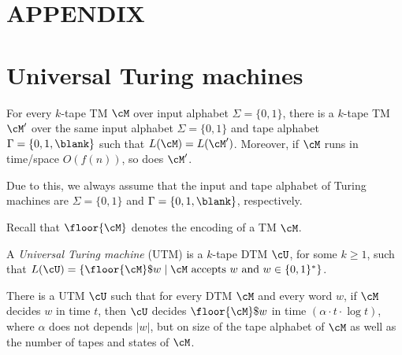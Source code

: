 \documentclass[11pt, a4paper]{article}
\begin{document}
\newpage
\appendix


\section*{APPENDIX}


\section{Universal Turing machines}


\begin{remark}
For every $k$-tape TM $\cM$ over input alphabet $\Sigma=\{0,1\}$,
there is a $k$-tape TM $\cM'$ over the same input alphabet $\Sigma =\{0,1\}$
and tape alphabet $\Gamma=\{0,1,\blank\}$ such that
$L(\cM)=L(\cM')$.
Moreover, if $\cM$ runs in time/space $O(f(n))$, so does $\cM'$.

Due to this, we always assume that the input and tape alphabet of Turing machines are 
$\Sigma=\{0,1\}$ and $\Gamma =\{0,1,\blank\}$, respectively. 
\end{remark}

Recall that $\floor {\cM}$ denotes the encoding of a TM $\cM$.

\begin{definition}
\label{def:utm}
A {\em Universal Turing machine} (UTM) is a $k$-tape DTM $\cU$, for some $k\geq 1$,
such that $L(\cU) = \{\floor{\cM}\$w \mid \cM \ \text{accepts}\ w \ \text{and}\ w \in \{0,1\}^*\}$.
\end{definition}

\begin{theorem}
\label{theo:utm}
There is a UTM $\cU$ such that for every DTM $\cM$ and every word $w$,
if $\cM$ decides $w$ in time $t$,
then $\cU$ decides $\floor{\cM}\$w$ in time $(\alpha\cdot t\cdot \log t)$,
where $\alpha$ does not depends $|w|$,
but on size of the tape alphabet of $\cM$ as well as the number of tapes and states of $\cM$.
\end{theorem}

 
\end{document}
